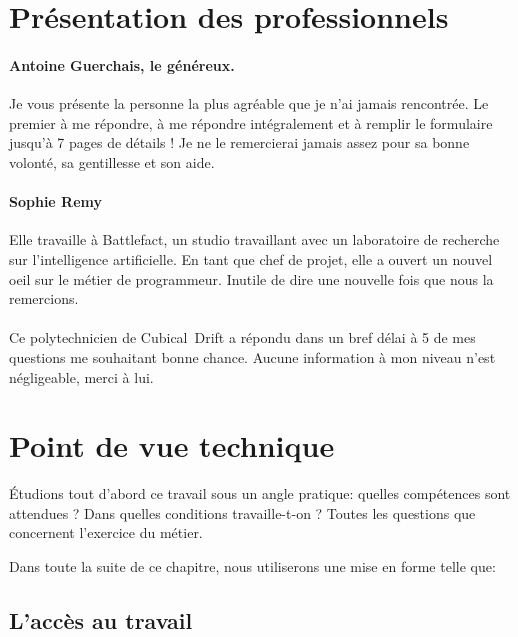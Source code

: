 \documentclass[12pt, a4paper]{report} %
\begin{document}
\section{Présentation des professionnels}
\paragraph{Antoine Guerchais, le généreux.}
Je vous présente la personne la plus agréable que je n'ai jamais rencontrée. Le premier à me répondre, à me répondre intégralement et à remplir le formulaire jusqu'à 7 pages de détails ! Je ne le remercierai jamais assez pour sa bonne volonté, sa gentillesse et son aide. 

\paragraph{Sophie Remy}
Elle travaille à Battlefact, un studio travaillant avec un laboratoire de recherche sur l'intelligence artificielle. En tant que chef de projet, elle a ouvert un nouvel oeil sur le métier de programmeur. Inutile de dire une nouvelle fois que nous la remercions.

\paragraph{\cubical{}}
Ce polytechnicien de Cubical~Drift  a répondu dans un bref délai à 5 de mes questions me souhaitant bonne chance. Aucune information à mon niveau n'est négligeable, merci à lui.

\section{Point de vue technique}
Étudions tout d'abord ce travail sous un angle pratique: quelles compétences sont attendues ? Dans quelles conditions travaille-t-on ? Toutes les questions que concernent l'exercice du métier.

Dans toute la suite de ce chapitre, nous utiliserons une mise en forme telle que:
\subsection{L'accès au travail}
\end{document}
